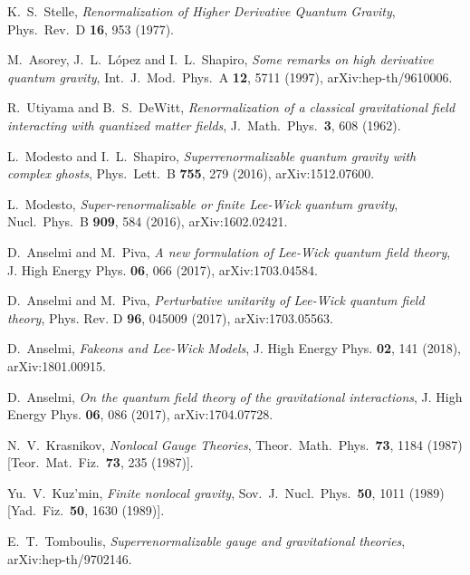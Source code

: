 \documentclass[aps,prd,a4paper,twocolumn,showpacs,showkeys,preprintnumbers,amsmath,amssymb,nofootinbib]{revtex4-2}
\numberwithin{equation}{section}
\begin{document}
\begin{thebibliography}{}
%
%

  K.~S.~Stelle,
{\it Renormalization of Higher Derivative Quantum Gravity},
Phys.\ Rev.\ D {\bf 16}, 953 (1977).

M.~Asorey, J.~L.~L\'opez and I.~L.~Shapiro,
{\it Some remarks on high derivative quantum gravity},
Int.\ J.\ Mod.\ Phys.\ A {\bf 12}, 5711 (1997), arXiv:hep-th/9610006.

R.~Utiyama and B.~S.~DeWitt,
{\it Renormalization of a classical gravitational field interacting with quantized matter fields},
J.\ Math.\ Phys.\  {\bf 3}, 608 (1962).

L.~Modesto and I.~L.~Shapiro,
{\it Superrenormalizable quantum gravity with complex ghosts},
Phys.\ Lett.\ B {\bf 755}, 279 (2016), arXiv:1512.07600.

L.~Modesto,
{\it Super-renormalizable or finite Lee-Wick quantum gravity},
Nucl.\ Phys.\ B {\bf 909}, 584 (2016), arXiv:1602.02421.

D.~Anselmi and M.~Piva,
{\it A new formulation of Lee-Wick quantum field theory},
J. High Energy Phys. \textbf{06}, 066 (2017),
arXiv:1703.04584.

D.~Anselmi and M.~Piva,
{\it Perturbative unitarity of Lee-Wick quantum field theory},
Phys. Rev. D \textbf{96}, 045009 (2017),
arXiv:1703.05563.

D.~Anselmi,
{\it Fakeons and Lee-Wick Models},
J. High Energy Phys. \textbf{02}, 141 (2018),
arXiv:1801.00915.

D.~Anselmi,
{\it On the quantum field theory of the gravitational interactions},
J. High Energy Phys.  \textbf{06}, 086 (2017),
arXiv:1704.07728.

  N.~V.~Krasnikov,
  {\it Nonlocal Gauge Theories},
  Theor.\ Math.\ Phys.\  {\bf 73}, 1184 (1987)
  [Teor.\ Mat.\ Fiz.\  {\bf 73}, 235 (1987)].

  Yu.~V.~Kuz'min,
  {\it Finite nonlocal gravity},
  Sov.\ J.\ Nucl.\ Phys.\  {\bf 50}, 1011 (1989)
  [Yad.\ Fiz.\  {\bf 50}, 1630 (1989)].

E.~T.~Tomboulis,
{\it Superrenormalizable gauge and gravitational theories},
arXiv:hep-th/9702146.


\end{thebibliography}
\end{document}
